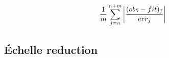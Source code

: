 \begin{displaymath}
   {1\over m}\sum_{j=n}^{n+m} \left|{(obs-fit)_j\over err_j}\right|
\end{displaymath}


\subsection{\label{techno13}\'Echelle reduction}


